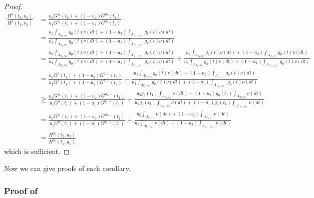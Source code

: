\documentclass{article}
\begin{document}
\begin{appendix}
\begin{proof}
    \begin{align*}
        \frac{H^{\theta}(t_2, u_2)}{H^{\theta}(t_1, u_1)} &= \frac{u_2G^{\theta_0}(t_2)  + (1-u_2) G^{\theta_0}(t_2)}{u_1 G^{\theta_0}(t_1)  + (1-u_1) G^{\theta_0}(t_1)}\\
        &= \frac{u_2  \int_{A_{[t_2, \infty)}}g_{\theta}(t) \nu(dt)  + (1-u_2) \int_{A_{(t_2, \infty)}} g_{\theta}(t) \nu(dt)}{u_1 \int_{A_{[t_1, \infty)}} g_{\theta}(t) \nu(dt)  + (1-u_1) \int_{A_{(t_1, \infty)}} g_{\theta}(t) \nu(dt)}\\
        &= \frac{u_2  \int_{A_{[t_1, \infty)}}g_{\theta}(t) \nu(dt)  + (1-u_2) \int_{A_{(t_1, \infty)}} g_{\theta}(t) \nu(dt)}{u_1 \int_{A_{[t_1, \infty)}} g_{\theta}(t) \nu(dt)  + (1-u_1) \int_{A_{(t_1, \infty)}} g_{\theta}(t) \nu(dt)} + \frac{u_2  \int_{A_{[t_2, t_1)}}g_{\theta}(t) \nu(dt)  + (1-u_2) \int_{A_{(t_2, t_1]}} g_{\theta}(t) \nu(dt)}{u_1 \int_{A_{[t_1, \infty)}} g_{\theta}(t) \nu(dt)  + (1-u_1) \int_{A_{(t_1, \infty)}} g_{\theta}(t) \nu(dt)}\\
        &= \frac{u_2G^{\theta}(t_1)  + (1-u_2) G^{\theta, +}(t_1)}{u_1 G^{\theta}(t_1)  + (1-u_1) G^{\theta, +}(t_1)} + \frac{u_2  \int_{A_{[t_2, t_1)}}g_{\theta}(t) \nu(dt)  + (1-u_2) \int_{A_{(t_2, t_1]}} g_{\theta}(t) \nu(dt)}{u_1 \int_{A_{[t_1, \infty)}} g_{\theta}(t) \nu(dt)  + (1-u_1) \int_{A_{(t_1, \infty)}} g_{\theta}(t) \nu(dt)}\\
        &\geq \frac{u_2G^{\theta_0}(t_1)  + (1-u_2) G^{\theta_0, +}(t_1)}{u_1 G^{\theta}(t_1)  + (1-u_1) G^{\theta_0, +}(t_1)} + \frac{u_2 g_{\theta}(t_1) \int_{A_{[t_2, t_1)}} \nu(dt)  + (1-u_2) g_{\theta}(t_1)  \int_{A_{(t_2, t_1]}}  \nu(dt)}{u_1 g_{\theta}(t_1) \int_{A_{[t_1, \infty)}}  \nu(dt)  + (1-u_1) g_{\theta}(t_1) \int_{A_{(t_1, \infty)}} \nu(dt)}\\
        &= \frac{u_2G^{\theta_0}(t_1)  + (1-u_2) G^{\theta_0, +}(t_1)}{u_1 G^{\theta}(t_1)  + (1-u_1) G^{\theta_0, +}(t_1)} + \frac{u_2 \int_{A_{[t_2, t_1)}} \nu(dt)  + (1-u_2)   \int_{A_{(t_2, t_1]}}  \nu(dt)}{u_1  \int_{A_{[t_1, \infty)}}  \nu(dt)  + (1-u_1) \int_{A_{(t_1, \infty)}} \nu(dt)}\\
        &= \frac{H^{\theta_0}(t_2, u_2)}{H^{\theta_0}(t_1, u_1)}
    \end{align*}
    which is sufficient. 

\end{proof}
\fi 

Now we can give proofs of each corollary. 

\subsubsection{Proof of }


\end{appendix}
\end{document}
